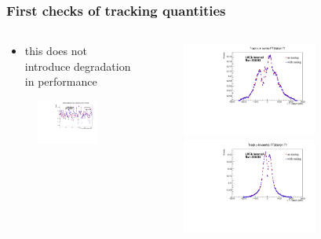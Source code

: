 \documentclass[aspectratio=1610, 12pt]{beamer}
\begin{document}
\begin{frame}\frametitle{First checks of tracking quantities}
  \begin{columns}
    \begin{column}[c]{0.48\textwidth}
      \begin{itemize}
        \item this does not introduce degradation in performance
      \end{itemize}
      \begin{figure}
        \includegraphics[width=0.9\textwidth]{plots/RMSResidualModulescomp_run269045.pdf}
      \end{figure}
    \end{column}
    \begin{column}[c]{0.48\textwidth}
      \begin{figure}
        \includegraphics[width=0.7\textwidth]{plots/xT1comp_run269045.pdf}
        \includegraphics[width=0.7\textwidth]{plots/yT1comp_run269045.pdf}
      \end{figure}
    \end{column}
  \end{columns}
\end{frame}
\end{document}
